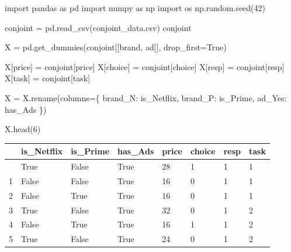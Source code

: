 \documentclass[
  letterpaper,
  DIV=11,
  numbers=noendperiod]{scrartcl}
\newenvironment{Shaded}{\begin{snugshade}}{\end{snugshade}}
\newcommand{\DecValTok}[1]{\textcolor[rgb]{0.68,0.00,0.00}{#1}}
\newcommand{\ImportTok}[1]{\textcolor[rgb]{0.00,0.46,0.62}{#1}}
\newcommand{\NormalTok}[1]{\textcolor[rgb]{0.00,0.23,0.31}{#1}}
\newcommand{\OperatorTok}[1]{\textcolor[rgb]{0.37,0.37,0.37}{#1}}
\newcommand{\StringTok}[1]{\textcolor[rgb]{0.13,0.47,0.30}{#1}}
\newcommand{\VariableTok}[1]{\textcolor[rgb]{0.07,0.07,0.07}{#1}}
\begin{document}
\begin{Shaded}
\begin{Highlighting}[]
\ImportTok{import}\NormalTok{ pandas }\ImportTok{as}\NormalTok{ pd}
\ImportTok{import}\NormalTok{ numpy }\ImportTok{as}\NormalTok{ np}
\ImportTok{import}\NormalTok{ os}
\NormalTok{np.random.seed(}\DecValTok{42}\NormalTok{)}

\NormalTok{conjoint }\OperatorTok{=}\NormalTok{ pd.read\_csv(}\StringTok{\textquotesingle{}conjoint\_data.csv\textquotesingle{}}\NormalTok{)}
\NormalTok{conjoint}

\NormalTok{X }\OperatorTok{=}\NormalTok{ pd.get\_dummies(conjoint[[}\StringTok{\textquotesingle{}brand\textquotesingle{}}\NormalTok{, }\StringTok{\textquotesingle{}ad\textquotesingle{}}\NormalTok{]], drop\_first}\OperatorTok{=}\VariableTok{True}\NormalTok{)}

\NormalTok{X[}\StringTok{\textquotesingle{}price\textquotesingle{}}\NormalTok{] }\OperatorTok{=}\NormalTok{ conjoint[}\StringTok{\textquotesingle{}price\textquotesingle{}}\NormalTok{]}
\NormalTok{X[}\StringTok{\textquotesingle{}choice\textquotesingle{}}\NormalTok{] }\OperatorTok{=}\NormalTok{ conjoint[}\StringTok{\textquotesingle{}choice\textquotesingle{}}\NormalTok{]}
\NormalTok{X[}\StringTok{\textquotesingle{}resp\textquotesingle{}}\NormalTok{] }\OperatorTok{=}\NormalTok{ conjoint[}\StringTok{\textquotesingle{}resp\textquotesingle{}}\NormalTok{]}
\NormalTok{X[}\StringTok{\textquotesingle{}task\textquotesingle{}}\NormalTok{] }\OperatorTok{=}\NormalTok{ conjoint[}\StringTok{\textquotesingle{}task\textquotesingle{}}\NormalTok{]}

\NormalTok{X }\OperatorTok{=}\NormalTok{ X.rename(columns}\OperatorTok{=}\NormalTok{\{}
    \StringTok{\textquotesingle{}brand\_N\textquotesingle{}}\NormalTok{: }\StringTok{\textquotesingle{}is\_Netflix\textquotesingle{}}\NormalTok{,}
    \StringTok{\textquotesingle{}brand\_P\textquotesingle{}}\NormalTok{: }\StringTok{\textquotesingle{}is\_Prime\textquotesingle{}}\NormalTok{,}
    \StringTok{\textquotesingle{}ad\_Yes\textquotesingle{}}\NormalTok{: }\StringTok{\textquotesingle{}has\_Ads\textquotesingle{}}  
\NormalTok{\})}

\NormalTok{X.head(}\DecValTok{6}\NormalTok{)}
\end{Highlighting}
\end{Shaded}

\begin{longtable}[]{@{}llllllll@{}}
\toprule\noalign{}
& is\_Netflix & is\_Prime & has\_Ads & price & choice & resp & task \\
\midrule\noalign{}
\endhead
\bottomrule\noalign{}
\endlastfoot
0 & True & False & True & 28 & 1 & 1 & 1 \\
1 & False & False & True & 16 & 0 & 1 & 1 \\
2 & False & True & True & 16 & 0 & 1 & 1 \\
3 & True & False & True & 32 & 0 & 1 & 2 \\
4 & False & True & True & 16 & 1 & 1 & 2 \\
5 & True & False & True & 24 & 0 & 1 & 2 \\
\end{longtable}
\end{document}
